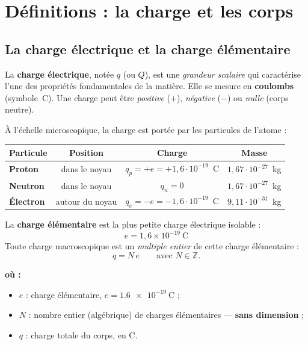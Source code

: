 \documentclass[11pt,a4paper]{article}
\newenvironment{ou}{%
  \par\smallskip\noindent\textbf{où :}\nopagebreak
  \begin{itemize}[leftmargin=1.8em,topsep=2pt,itemsep=1.5pt,parsep=0pt]}%
  {\end{itemize}}
\begin{document}
\section{Définitions : la charge et les corps}

\subsection{La charge électrique et la charge élémentaire}

\begin{definition}
La \textbf{charge électrique}, notée $q$ (ou $Q$), est une \emph{grandeur scalaire} qui caractérise
l'une des propriétés fondamentales de la matière. Elle se mesure en \textbf{coulombs} (symbole~C).
Une charge peut être \emph{positive} ($+$), \emph{négative} ($-$) ou \emph{nulle} (corps neutre).
\end{definition}

À l'échelle microscopique, la charge est portée par les particules de l'atome :

\begin{center}
\renewcommand{\arraystretch}{1.35}
\begin{tabular}{>{\bfseries}l c c c}
\rowcolor{primary!18}
Particule & Position & Charge & Masse \\
\midrule
Proton   & dans le noyau        & $q_p = +e = +1{,}6\cdot 10^{-19}$~C & $1{,}67\cdot 10^{-27}$~kg \\
Neutron  & dans le noyau        & $q_n = 0$                            & $1{,}67\cdot 10^{-27}$~kg \\
Électron & autour du noyau      & $q_e = -e = -1{,}6\cdot 10^{-19}$~C & $9{,}11\cdot 10^{-31}$~kg \\
\end{tabular}
\end{center}

\begin{formule}
La \textbf{charge élémentaire} est la plus petite charge électrique isolable :
\[ \boxed{\,e = 1{,}6\times 10^{-19}\ \mathrm{C}\,} \]
Toute charge macroscopique est un \emph{multiple entier} de cette charge élémentaire :
\[ q = N\,e \qquad \text{avec } N\in\mathbb{Z}. \]
\begin{ou}
  \item $e$ : charge élémentaire, $e = \SI{1.6e-19}{\coulomb}$ ;
  \item $N$ : nombre entier (algébrique) de charges élémentaires — \textbf{sans dimension} ;
  \item $q$ : charge totale du corps, en \si{\coulomb}.
\end{ou}
\end{formule}
\end{document}
